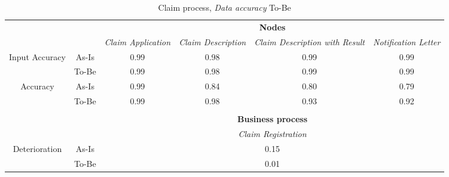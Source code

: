 \begin{center}
\begin{table}[H]
\begin{tabular}{|c|c|p{2cm}|p{2.5cm}|p{2.5cm}|p{2.5cm}|}


\cline{3-6}
\multicolumn{2}{c}{} & \multicolumn{4}{|c|}{\textbf{Nodes}} \\ \cline{3-6}
\multicolumn{2}{c|}{} & \textsl{Claim Application} & \textsl{Claim Description} & \textsl{Claim Description with Result} & \textsl{Notification Letter}\\
\hline
\multirow{2}{*}{Input Accuracy} & As-Is & \multicolumn{1}{c|}{0.99} & \multicolumn{1}{c|}{0.98} & \multicolumn{1}{c|}{0.99} & \multicolumn{1}{c|}{0.99}\\ \cline{2-6}
								& To-Be & \multicolumn{1}{c|}{0.99} & \multicolumn{1}{c|}{0.98} & \multicolumn{1}{c|}{0.99} & \multicolumn{1}{c|}{0.99}\\ \hline

\multirow{2}{*}{Accuracy} 		& As-Is & \multicolumn{1}{c|}{0.99} & \multicolumn{1}{c|}{0.84} & \multicolumn{1}{c|}{0.80} & \multicolumn{1}{c|}{0.79}\\ \cline{2-6}
								& To-Be & \multicolumn{1}{c|}{0.99} & \multicolumn{1}{c|}{0.98} & \multicolumn{1}{c|}{0.93} & \multicolumn{1}{c|}{0.92}\\ \hline

\multicolumn{6}{c}{} \\ \cline{3-6}
\multicolumn{2}{c}{} & \multicolumn{4}{|c|}{\textbf{Business process}} \\ \cline{3-6}
\multicolumn{2}{c|}{} & \multicolumn{4}{|c|}{\textsl{Claim Registration}} \\ \hline
\multirow{2}{*}{Deterioration} & As-Is & \multicolumn{4}{|c|}{0.15}\\ \cline{2-6}
							   & To-Be & \multicolumn{4}{|c|}{0.01}\\ \hline
\end{tabular}
\caption{Claim process, \textsl{Data accuracy} To-Be}
\label{tab:claim_to_be}
\end{table}
\end{center}